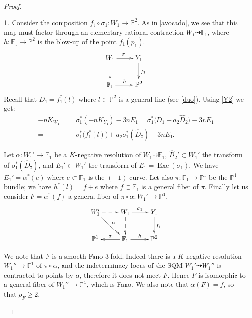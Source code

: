 \documentclass[10pt,a4paper]{amsart}
\theoremstyle{definition}
\newtheorem{prg}[thm]{}
\numberwithin{figure}{section}
\numberwithin{table}{section}
\newcommand{\wi}{\widehat}
\newcommand{\pr}{\mathbb{P}}
\newcommand{\Exc}{\operatorname{Exc}}
\begin{document}
\begin{proof}
\begin{prg}
Consider the composition $f_1\circ\sigma_1\colon W_1\to\pr^2$. As in \ref{avocado}, we see that this map must factor through an elementary rational contraction $W_1\dasharrow \mathbb{F}_1$, where $h\colon \mathbb{F}_1\to \pr^2$ is the blow-up of the point $f_1(p_1)$. 
$$\xymatrix{ {W_1}\ar@{-->}[d]\ar[r]^{\sigma_1}&{Y_1}\ar[d]^{f_1}\\
 {\mathbb{F}_1}\ar[r]^h&{\pr^2}
  }$$
  Recall that $D_1=f_1^*(l)$ where  $l\subset\pr^2$ is a general line (see \ref{duo}).  Using \eqref{Y2} we get:
  \begin{equation}\label{summer}
  \begin{split}
  -nK_{W_1} = & \ \sigma_1^*(-nK_{Y_1})-3nE_1=\sigma_1^*\bigl(D_1+a_2\wi{D}_2\bigr)-3nE_1\\
 = &\ \sigma_1^*\bigl(f_1^*(l)\bigr)+a_2\sigma_1^*(\wi{D}_2)-3nE_1.
  \end{split}
 \end{equation}

  Let $\alpha\colon W_1'\to\mathbb{F}_1$ be a $K$-negative resolution of $W_1\dasharrow\mathbb{F}_1$, $\wi{D}_2'\subset W_1'$ the transform of $\sigma_1^*(\wi{D}_2)$, and
$E_1'\subset W_1'$ the transform of $E_1=\Exc(\sigma_1)$. 
We have
  $E_1'=\alpha^*(e)$ where  $e\subset \mathbb{F}_1$
  is the $(-1)$-curve. Let also
  $\pi\colon\mathbb{F}_1\to\pr^1$ be the $\pr^1$-bundle; we have $h^*(l)=f+e$ where $f\subset \mathbb{F}_1$ is a general fiber of $\pi$. Finally let us consider $F=\alpha^*(f)$  a general fiber of $\pi\circ\alpha\colon W_1'\to\pr^1$.
$$\xymatrix{{W_1'}\ar@{-->}[r]\ar[dr]^{\alpha}& {W_1}\ar@{-->}[d]\ar[r]^{\sigma_1}&{Y_1}\ar[d]^{f_1}\\
{\pr^1}& {\mathbb{F}_1}\ar[l]_{\pi}\ar[r]^h&{\pr^2}
}$$

We note that $F$ is a smooth Fano $3$-fold. Indeed there is a $K$-negative resolution $W_1''\to\pr^1$ of $\pi\circ\alpha$, and the indeterminacy locus of the SQM $W_1'\dasharrow W_1''$ is contracted to points by $\alpha$, therefore it does not meet $F$. Hence $F$ is isomorphic to a general fiber of  $W_1''\to\pr^1$, which is Fano. We also note that $\alpha(F)=f$, so that $\rho_F\geq 2$.
  

\end{prg}
\end{proof}
\end{document}
